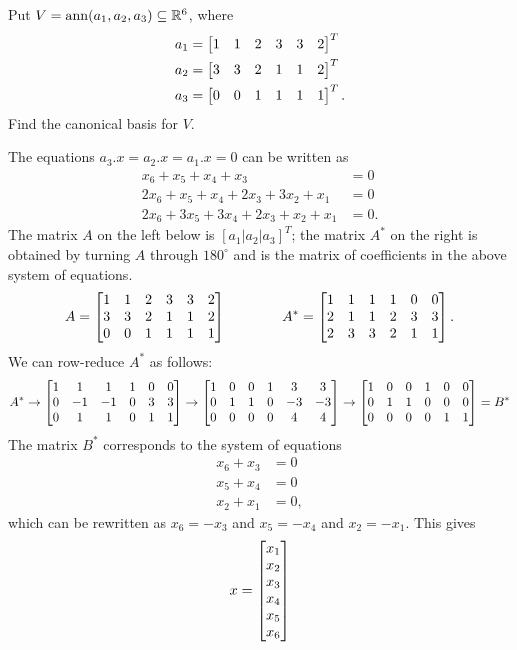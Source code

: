 \documentclass[a4paper]{amsart}
\renewenvironment{solution}{\SolutionInline}{\endSolutionInline}
\begin{document}
\begin{exercise}\label{ex-ann-canonical-i}
 Put $V=\operatorname{ann}(a_1,a_2,a_3)\subseteq{\mathbb{R}}^6$, where 
 \begin{align*}
  a_1 &= \left[\begin{matrix} 1&1&2&3&3&2 \end{matrix}\right]^T \\
  a_2 &= \left[\begin{matrix} 3&3&2&1&1&2 \end{matrix}\right]^T \\
  a_3 &= \left[\begin{matrix} 0&0&1&1&1&1 \end{matrix}\right]^T.
 \end{align*}
 Find the canonical basis for $V$.
\end{exercise}
\begin{solution}
 The equations $a_3.x=a_2.x=a_1.x=0$ can be written as
 \begin{align*}
  x_6+x_5+x_4+x_3 &= 0 \\
  2x_6+x_5+x_4+2x_3+3x_2+x_1 &= 0 \\
  2x_6+3x_5+3x_4+2x_3+x_2+x_1 &= 0.
 \end{align*}
 The matrix $A$ on the left below is $[a_1|a_2|a_3]^T$; the matrix
 $A^*$ on the right is obtained by turning $A$ through $180^\circ$ and
 is the matrix of coefficients in the above system of equations.
 \[ 
  A   = \left[\begin{matrix} 1&1&2&3&3&2 \\
             3&3&2&1&1&2 \\
             0&0&1&1&1&1 \end{matrix}\right] \hspace{4em}
  A^* = \left[\begin{matrix} 1&1&1&1&0&0 \\
             2&1&1&2&3&3 \\
             2&3&3&2&1&1 \end{matrix}\right].
 \]
 We can row-reduce $A^*$ as follows:
 \[ A^* \to 
     \left[\begin{matrix} 1&1&1&1&0&0 \\
          0&-1&-1&0&3&3 \\
          0&1&1&0&1&1 \end{matrix}\right]
     \to 
     \left[\begin{matrix} 1&0&0&1&3&3 \\
          0&1&1&0&-3&-3 \\
          0&0&0&0&4&4 \end{matrix}\right]
     \to 
     \left[\begin{matrix} 1&0&0&1&0&0 \\
          0&1&1&0&0&0 \\
          0&0&0&0&1&1 \end{matrix}\right]
    = B^*
 \]
 The matrix $B^*$ corresponds to the system of equations 
 \begin{align*}
  x_6+x_3 &= 0 \\
  x_5+x_4 &= 0 \\
  x_2+x_1 &= 0,
 \end{align*}
 which can be rewritten as $x_6=-x_3$ and $x_5=-x_4$ and $x_2=-x_1$.
 This gives
 \[ x = \left[\begin{matrix} x_1\\ x_2 \\ x_3 \\ x_4 \\ x_5 \\ x_6 \end{matrix}\right] 
\]
\end{solution}
\end{document}
